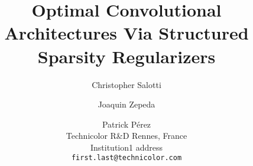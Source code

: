 \documentclass[10pt,twocolumn,letterpaper]{article}
\begin{document}
\title{Optimal Convolutional Architectures Via Structured Sparsity Regularizers}

\author{Christopher Salotti \and Joaquin Zepeda \and Patrick P\'erez\\
Technicolor R\&D Rennes, France\\
Institution1 address\\
{\tt\small first.last@technicolor.com}
}

\maketitle








{\small


}
\end{document}
